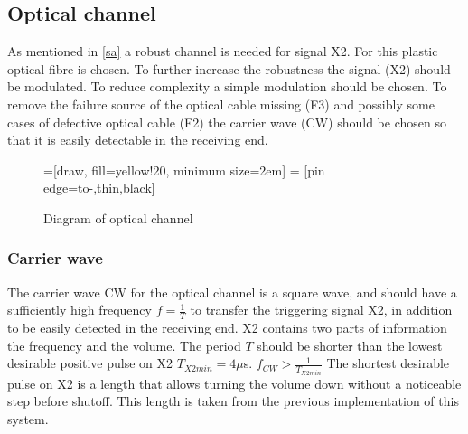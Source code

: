 \subsection{Optical channel}
\label{optical}

As mentioned in \cref{sa} a robust channel is needed for signal X2. For this plastic optical fibre is chosen. To further increase the robustness the signal (X2) should be modulated. To reduce complexity a simple modulation should be chosen. To remove the failure source of the optical cable missing (F3) and possibly some cases of defective optical cable (F2) the carrier wave (CW) should be chosen so that it is easily detectable in the receiving end.

\begin{figure}
    \centering
    =[draw, fill=yellow!20, minimum size=2em]
     = [pin edge={to-,thin,black}]
    \caption{Diagram of optical channel}
    \label{fig:my_label}
\end{figure}

\subsubsection{Carrier wave}
\label{carrier_wave}
The carrier wave CW for the optical channel is a square wave, and should have a sufficiently high frequency $f=\frac{1}{T}$ to transfer the triggering signal X2, in addition to be easily detected in the receiving end. X2 contains two parts of information the frequency and the volume. The period $T$ should be shorter than the lowest desirable positive pulse on X2 $T_{X2min}= 4\mu$s. $f_{CW} > \frac{1}{T_{X2min}}$
The shortest desirable pulse on X2 is a length that allows turning the volume down without a noticeable step before shutoff. This length is taken from the previous implementation of this system.

